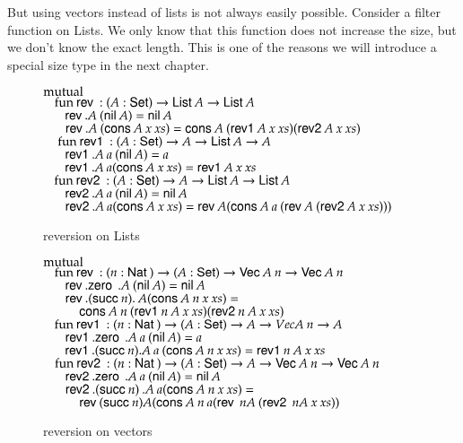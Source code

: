 But using vectors instead of lists is not always easily possible.
Consider a filter function on Lists. We only know that this function does not increase the size, but
we don't know the exact length.
This is one of the reasons we will introduce a special size type in the next chapter.

\begin{figure}
$\mathrm{mutual}\: $  \\
$ \hspace*{3mm} \mathrm{fun}\: \mathsf{rev}\: : ( A : \mathsf{Set} ) \rightarrow{\mathsf{List}\:A \rightarrow\mathsf{List}\:A} $ \\
$ \spc \spc \rev .A \: (\nil A ) = \nil A$\\
$ \spc \spc \rev .A \: (\cons A \:x  \: xs) = \cons A \: (\reva A \: x \: xs) (\revb A \: x \: xs)$\\
$\ \hspace*{3mm} \mathrm{fun}\: \mathsf{rev1}\: : ( A  : \mathsf{Set} ) \rightarrow{A  \rightarrow\mathsf{List}\:A \rightarrow A}$\\
$ \spc \spc \reva .A \: a \: (\nil A ) = a$ \\
$\spc \spc \reva .A \: a (\cons A \: x \: xs) = \reva A \: x \: xs$\\
$\hspace*{3mm} \mathrm{fun}\: \mathsf{rev2}\: : ( A : \mathsf{Set} ) \rightarrow{ A \rightarrow\mathsf{List}\:A \rightarrow\mathsf{List}\:A} $\\
$\spc \spc \revb .A \: a \: (\nil A ) = \nil A $\\
$\spc \spc \revb .A \: a (\cons A\:  x \: xs) = \rev A (\cons A \: a \: (\rev A \: (\revb A \: x \: xs)))$

\caption{reversion on Lists}  
\end{figure}
\begin{figure} 
$\mathrm{mutual}\: $ \\
$\hspace*{3mm} \mathrm{fun}\: \mathsf{rev}\: : ( n : \mathsf{Nat}\:  ) \rightarrow{( A : \mathsf{Set}) \rightarrow{\mathsf{Vec}\:A \: n \rightarrow\mathsf{Vec}\:A \: n}}$\\
$\spc \spc \rev .\zero \: .A  \: (\nil A) = \nil A $\\
$\spc \spc \rev .(\suc n) .\: A (\cons A \: n \: x \: xs) = $\\
$\spcx \cons A \: n \: (\reva n \: A \: x \: xs) (\revb n \: A \: x \: xs) $ \\
$\hspace*{3mm} \mathrm{fun}\: \mathsf{rev1}\: : ( n : \mathsf{Nat}\: ) \rightarrow( A : \mathsf{Set} ) \rightarrow{A \rightarrow Vec A \: n \rightarrow A}$\\
$\spc \spc \reva .\zero  \: .A \: a \: (\nil A) = a $\\
$\spc \spc \reva .(\suc n) .A \: a \: (\cons A \: n \: x \: xs) = \reva n \: A \: x \: xs $\\
$\hspace*{3mm} \mathrm{fun}\: \mathsf{rev2}\: : ( n : \mathsf{Nat}\: ) \rightarrow{( A : \mathsf{Set}) \rightarrow{A \rightarrow\mathsf{Vec}\:A \: n \rightarrow\mathsf{Vec}\:A \: n}}$\\
$ \spc \spc \revb .\zero \: .A  \: a \: (\nil A) = \nil A $\\
$ \spc \spc \revb .(\suc n) \: .A \: a (\cons A \: n \: x \: xs) = $\\
$ \spcx \rev (\suc n) A (\cons A \: n \: a (\rev \: n A \: (\revb \: n A \: x \: xs))$
\caption{reversion on vectors}  
\end{figure}  

